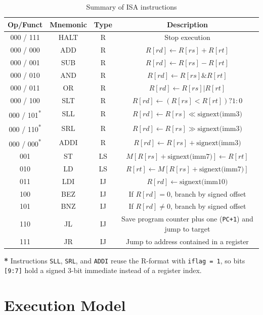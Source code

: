 \documentclass[12pt]{report}
\begin{document}
\begin{table}[!htbp]
\centering
\small
\begin{tabular}{cccc}
\toprule
\textbf{Op/Funct} & \textbf{Mnemonic} & \textbf{Type} & \textbf{Description} \\
\midrule
000 / 111 & HALT & R & Stop execution \\
000 / 000 & ADD  & R & $R[rd] \leftarrow R[rs] + R[rt]$ \\
000 / 001 & SUB  & R & $R[rd] \leftarrow R[rs] - R[rt]$ \\
000 / 010 & AND  & R & $R[rd] \leftarrow R[rs] \& R[rt]$ \\
000 / 011 & OR   & R & $R[rd] \leftarrow R[rs] | R[rt]$ \\
000 / 100 & SLT  & R & $R[rd] \leftarrow (R[rs] < R[rt]) ? 1 : 0$ \\
000 / 101\textsuperscript{*} & SLL  & R & $R[rd] \leftarrow R[rs] \ll \text{signext(imm3)}$ \\
000 / 110\textsuperscript{*} & SRL  & R & $R[rd] \leftarrow R[rs] \gg \text{signext(imm3)}$ \\
000 / 000\textsuperscript{*} & ADDI & R & $R[rd] \leftarrow R[rs] + \text{signext(imm3)}$ \\
\midrule
001 & ST  & LS & $M[R[rs] + \text{signext(imm7)}] \leftarrow R[rt]$ \\
010 & LD  & LS & $R[rt] \leftarrow M[R[rs] + \text{signext(imm7)}]$ \\
\midrule
011 & LDI & IJ & $R[rd] \leftarrow \text{signext(imm10)}$ \\
100 & BEZ & IJ & If $R[rd] = 0$, branch by signed offset \\
101 & BNZ & IJ & If $R[rd] \neq 0$, branch by signed offset \\
110 & JL  & IJ & Save program counter plus one (\texttt{PC+1}) and jump to target \\
111 & JR  & IJ & Jump to address contained in a register \\
\bottomrule
\end{tabular}
\caption{Summary of ISA instructions}
\label{tab:isa-summary}
\end{table}

\noindent\textbf{*} Instructions \texttt{SLL}, \texttt{SRL}, and \texttt{ADDI}
reuse the R-format with \texttt{iflag = 1}, so bits \texttt{[9:7]} hold a
signed 3-bit immediate instead of a register index.

\section{Execution Model}
\end{document}
